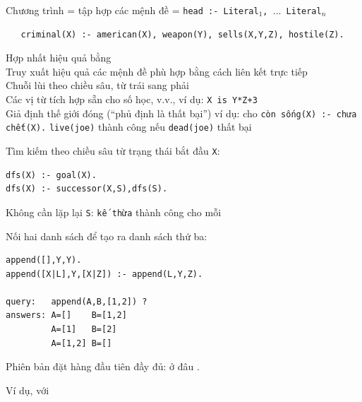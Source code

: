 \documentclass{article}
\begin{document}
\begin{huge}
Chương trình = tập hợp các mệnh đề = {\tt head :- Literal$_1$, $\ldots$ Literal$_n$}
\begin{LARGE}\begin{verbatim}
   criminal(X) :- american(X), weapon(Y), sells(X,Y,Z), hostile(Z).
\end{verbatim}\end{LARGE}

Hợp nhất hiệu quả bằng \\
Truy xuất hiệu quả các mệnh đề phù hợp bằng cách liên kết trực tiếp\\
Chuỗi lùi theo chiều sâu, từ trái sang phải\\
Các vị từ tích hợp sẵn cho số học, v.v., ví dụ: {\tt X is Y*Z+3}\\
Giả định thế giới đóng (``phủ định là thất bại'')\al
   ví dụ: cho {\tt còn sống(X) :- chưa chết(X).}\al
   {\tt live(joe)} thành công nếu {\tt dead(joe)} thất bại




Tìm kiếm theo chiều sâu từ trạng thái bắt đầu {\tt X}:
\begin{verbatim}
dfs(X) :- goal(X).
dfs(X) :- successor(X,S),dfs(S).
\end{verbatim}
Không cần lặp lại {\tt S}: {\tt kế thừa} thành công cho mỗi

Nối hai danh sách để tạo ra danh sách thứ ba:
\begin{verbatim}
append([],Y,Y).                         
append([X|L],Y,[X|Z]) :- append(L,Y,Z). 
                                        
query:   append(A,B,[1,2]) ?            
answers: A=[]    B=[1,2]
         A=[1]   B=[2]
         A=[1,2] B=[]
\end{verbatim}





Phiên bản đặt hàng đầu tiên đầy đủ:
ở đâu .

Ví dụ,
với 


\end{huge}
\end{document}
